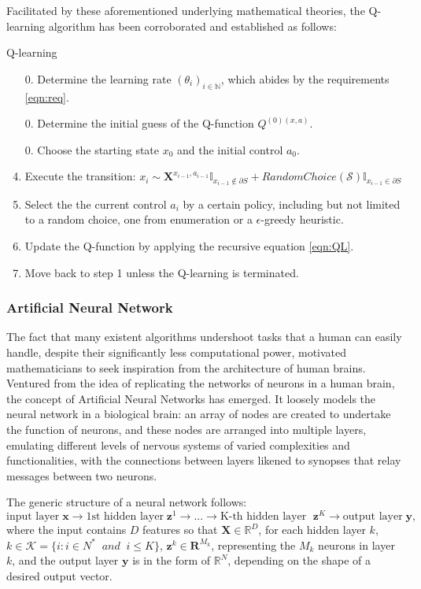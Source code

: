 \documentclass[11pt,twoside]{article}
\numberwithin{Theorem}{section}
\numberwithin{Definition}{section}
\numberwithin{Lemma}{section}
\numberwithin{Algorithm}{section}
\numberwithin{equation}{section}
\begin{document}
Facilitated by these aforementioned underlying mathematical theories, the Q-learning algorithm has been corroborated and established as follows:

\begin{algorithm}[H]
\caption{Q-learning}
\begin{enumerate}
    \item[0.] Determine the learning rate $(\theta_i)_{i\in\mathbb{N}}$, which abides by the requirements \ref{eqn:req}.
    \item[0.] Determine the initial guess of the Q-function $Q^{(0)(x,a)}$.
    \item[0.] Choose the starting state $x_0$ and the initial control $a_0$.
    \item Execute the transition: $x_{i}\sim\mathbf{X}^{x_{i-1},a_{i-1}}\mathbb{I}_{x_{i-1}\notin\partial S}+RandomChoice(\mathcal{S})\mathbb{I}_{x_{i-1}\in\partial S}$
    \item Select the the current control $a_i$ by a certain policy, including but not limited to a random choice, one from enumeration or a $\epsilon$-greedy heuristic. 
    \item Update the Q-function by applying the recursive equation \ref{eqn:QL}.
    \item Move back to step 1 unless the Q-learning is terminated.
\end{enumerate}
\end{algorithm}

\subsubsection{Artificial Neural Network}
The fact that many existent algorithms undershoot tasks that a human can easily handle, despite their significantly less computational power, motivated mathematicians to seek inspiration from the architecture of human brains. Ventured from the idea of replicating the networks of neurons in a human brain, the concept of Artificial Neural Networks has emerged. It loosely models the neural network in a biological brain: an array of nodes are created to undertake the function of neurons, and these nodes are arranged into multiple layers, emulating different levels of nervous systems of varied complexities and functionalities, with the connections between layers likened to synopses that relay messages between two neurons. 

The generic structure of a neural network follows: 
$$\text{input layer}\;\mathbf{x}\rightarrow\text{1st hidden layer}\;\mathbf{z}^1\rightarrow ...\rightarrow\text{K-th hidden layer }\;\mathbf{z}^K\rightarrow\text{output layer}\;\mathbf{y},$$
where the input contains $D$ features so that $\mathbf{X}\in \mathbb{R}^D$, for each hidden layer $k$, $k\in\mathcal{K}=\{i:i\in N^*\;\;and\;\;i\leq K\}$, $\mathbf{z}^k\in\mathbf{R}^{M_k}$, representing the $M_k$ neurons in layer $k$, and the output layer $\mathbf{y}$ is in the form of $\mathbb{R}^N$, depending on the shape of a desired output vector.
\end{document}
